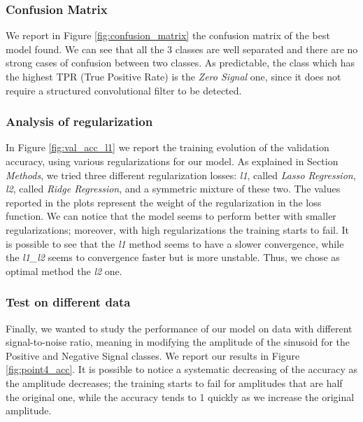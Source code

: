 \documentclass[prl, twocolumn]{revtex4-1}
\begin{document}
\subsubsection{Confusion Matrix}

We report in Figure \ref{fig:confusion_matrix} the confusion matrix of the best model found. We can see that all the 3 classes are well separated and there are no strong cases of confusion between two classes. As predictable, the class which has the highest TPR (True Positive Rate) is the \textit{Zero Signal} one, since it does not require a structured convolutional filter to be detected.



\subsubsection{Analysis of regularization}

In Figure \ref{fig:val_acc_l1} we report the training evolution of the validation accuracy, using various regularizations for our model. As explained in Section \textit{Methods}, we tried three different regularization losses: \textit{l1}, called \textit{Lasso Regression}, \textit{l2}, called \textit{Ridge Regression}, and a symmetric mixture of these two. The values reported in the plots represent the weight of the regularization in the loss function. We can notice that the model seems to perform better with smaller regularizations; moreover, with high regularizations the training starts to fail. It is possible to see that the \textit{l1} method seems to have a slower convergence, while the \textit{l1\_l2} seems to convergence faster but is more unstable. Thus, we chose as optimal method the \textit{l2} one.



\subsubsection{Test on different data}

Finally, we wanted to study the performance of our model on data with different signal-to-noise ratio, meaning in modifying the amplitude of the sinusoid for the Positive and Negative Signal classes. We report our results in Figure \ref{fig:point4_acc}. It is possible to notice a systematic decreasing of the accuracy as the amplitude decreases; the training starts to fail for amplitudes that are half the original one, while the accuracy tends to 1 quickly as we increase the original amplitude.
\end{document}
